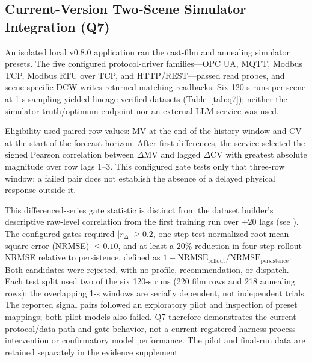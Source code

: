 \subsection{Current-Version Two-Scene Simulator Integration (Q7)}
\label{sec:crossscene}
An isolated local v0.8.0 application ran the cast-film and annealing simulator
presets. The five configured protocol-driver families---OPC UA, MQTT,
Modbus TCP, Modbus RTU over TCP, and HTTP/REST---passed read probes, and
scene-specific DCW writes returned matching readbacks. Six 120-s runs per
scene at 1-s sampling yielded lineage-verified datasets (Table~\ref{tab:q7});
neither the simulator truth/optimum endpoint nor an external LLM service was
used.

Eligibility used paired row values: MV at the end of the history window and
CV at the start of the forecast horizon. After first differences, the service
selected the signed Pearson correlation between $\Delta$MV and lagged $\Delta$CV
with greatest absolute magnitude over row lags 1--3.
This configured gate tests only that three-row window; a failed pair does not
establish the absence of a delayed physical response outside it.

This differenced-series gate statistic is distinct from the
dataset builder's descriptive raw-level correlation from the first training
run over $\pm20$ lags (see ). The configured gates
required $|r_{\Delta}|\geq0.2$, one-step test normalized root-mean-square error
(NRMSE) $\leq0.10$, and at least a 20\% reduction in four-step rollout NRMSE
relative to persistence, defined as $1-\mathrm{NRMSE}_{\mathrm{rollout}}/
\mathrm{NRMSE}_{\mathrm{persistence}}$. Both candidates were rejected, with
no profile, recommendation, or dispatch. Each test split used two of the six
120-s runs (220 film rows and 218 annealing rows); the overlapping 1-s windows
are serially dependent, not independent trials. The reported signal
pairs followed an exploratory pilot and inspection of preset mappings; both
pilot models also failed. Q7 therefore demonstrates the current protocol/data
path and gate behavior, not a current registered-harness process intervention
or confirmatory model performance. The pilot and final-run data are retained
separately in the evidence supplement.

